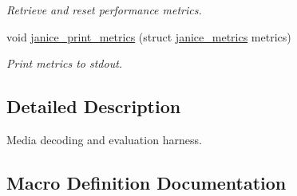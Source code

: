 \begin{DoxyCompactItemize}
\begin{DoxyCompactList}\small\item\em Retrieve and reset performance metrics. \end{DoxyCompactList}\item 
void \hyperlink{group__janice__io_ga34184d56e2c5585facb11e1e6b734325}{janice\+\_\+print\+\_\+metrics} (struct \hyperlink{structjanice__metrics}{janice\+\_\+metrics} metrics)
\begin{DoxyCompactList}\small\item\em Print metrics to stdout. \end{DoxyCompactList}\end{DoxyCompactItemize}


\subsection{Detailed Description}
Media decoding and evaluation harness. 



\subsection{Macro Definition Documentation}
\hypertarget{group__janice__io_ga39a97708cd80add78fa1fccf8b23c6f3}{}
